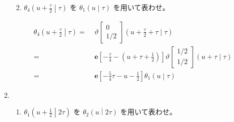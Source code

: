 \documentclass[12pt,b5paper]{ltjsarticle}
\begin{document}
\begin{enumerate}
\begin{enumerate}
\begin{enumerate}
                    \hrulefill

              \item $\displaystyle \theta_{4} \left(u+\frac{\tau}{2} \middle| \tau \right)$
                    を
                    $\displaystyle \theta_{1} \left(u \middle| \tau \right)$
                    を用いて表わせ。

                    \dotfill

                    \begin{align}
                     \theta_{4} \left(u+\frac{\tau}{2} \middle| \tau \right)
                     =&\;
                     \vartheta \begin{bmatrix} 0 \\ 1/2 \end{bmatrix} (u+\frac{\tau}{2}+\tau \mid \tau)\\
                     =&\; \mathbf{e}[-\frac{\tau}{4} -(u+\tau+\frac{1}{2})]
                     \vartheta \begin{bmatrix} 1/2 \\ 1/2 \end{bmatrix} (u+\tau \mid \tau)\\
                     =&\; \mathbf{e}[-\frac{5}{4}\tau -u-\frac{1}{2}]
                     \theta_{1} \left(u \middle| \tau \right)
                    \end{align}

                    \hrulefill
             \end{enumerate}

        \item
             \begin{enumerate}
              \item $\displaystyle \theta_{1} \left(u+\frac{1}{2} \middle| 2\tau \right)$
                    を
                    $\displaystyle \theta_{2} \left(u \middle| 2\tau \right)$
                    を用いて表わせ。

                    \dotfill


\end{enumerate}
\end{enumerate}
\end{enumerate}
\end{document}
